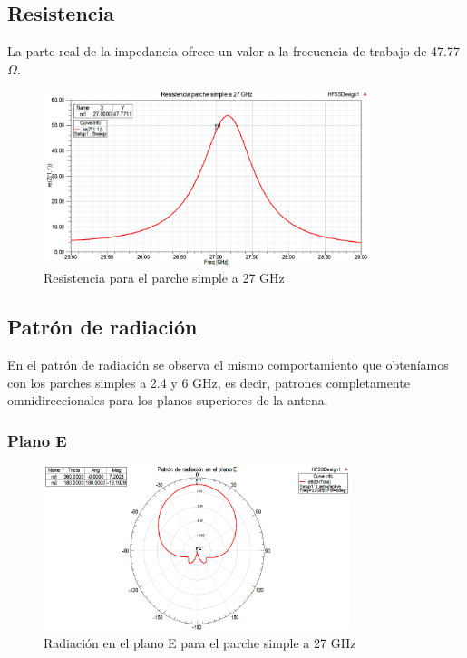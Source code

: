 \subsection{Resistencia}
\par La parte real de la impedancia ofrece un valor a la frecuencia de trabajo de 47.77 $\Omega$.
\\
\begin{figure}[H]
    \centering
        \includegraphics[width=0.85\textwidth]{archivos/analisis/1x13/3}
        \caption{Resistencia para el parche simple a 27 GHz}
        \label{fig:resis1x13}
\end{figure}


\subsection{Patrón de radiación}
\par En el patrón de radiación se observa el mismo comportamiento que obteníamos con los parches simples a 2.4 y 6 GHz, es decir, patrones completamente omnidireccionales para los planos superiores de la antena.
\\
\subsubsection{Plano E}
\begin{figure}[H]
    \centering
        \includegraphics[width=0.8\textwidth]{archivos/analisis/1x13/4}
        \caption{Radiación en el plano E para el parche simple a 27 GHz}
        \label{fig:E1x13}
\end{figure}

